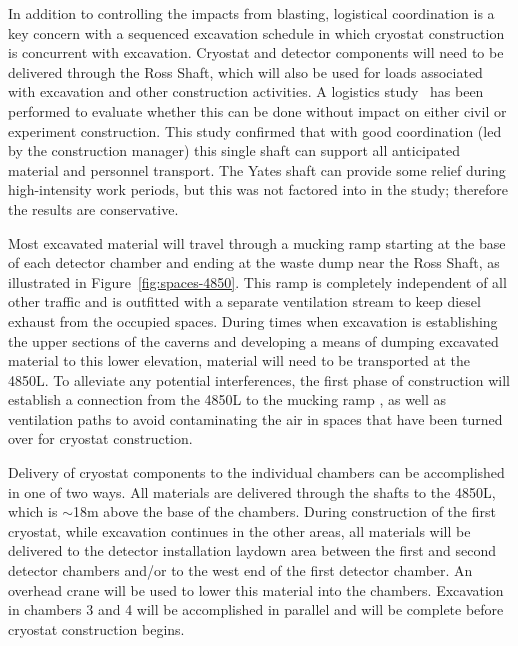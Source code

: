 In addition to controlling the impacts from blasting, logistical coordination is a key concern with a sequenced excavation schedule in which cryostat construction is concurrent with excavation. %
Cryostat and detector components will need to be delivered through the Ross Shaft, which will also be used for loads associated with excavation and other construction activities. A logistics study~\cite{lbnf-logistics} has been performed to evaluate whether this can be done without impact on either civil or experiment construction.  This study confirmed that with good coordination (led by the construction manager) this single shaft can support all anticipated material and personnel transport. %
The Yates shaft can provide some relief during high-intensity work periods, but this was not factored into %
in the study; therefore the results are conservative. %

Most excavated material will travel through a mucking ramp starting at the base of each detector chamber and ending at the waste dump near the Ross Shaft, as illustrated in Figure~\ref{fig:spaces-4850}. This %
ramp is completely independent of all other traffic and is outfitted with %
a separate ventilation stream to keep diesel exhaust from %
the occupied spaces. During times when excavation is establishing the upper sections of the caverns and developing a means of dumping excavated material to this lower elevation, material will need to be transported at the 4850L. 
 To alleviate any potential interferences, the first phase of construction will establish a connection from the 4850L to the mucking ramp  , as well as ventilation paths to avoid contaminating the air in spaces that have been turned over for cryostat construction. 

Delivery of cryostat components to the individual chambers can be accomplished in one of two ways. 
 All materials are delivered through the shafts to the 4850L, which is $\sim$18m above the base of the chambers. During construction of the first cryostat, while excavation continues in the other areas, all materials will be delivered to the detector installation laydown area between the first and second detector chambers and/or to the west end of the first detector chamber. An overhead crane will be used to lower this material into the chambers. Excavation in chambers 3 and 4 will be accomplished in parallel and will be complete before cryostat construction begins. %

